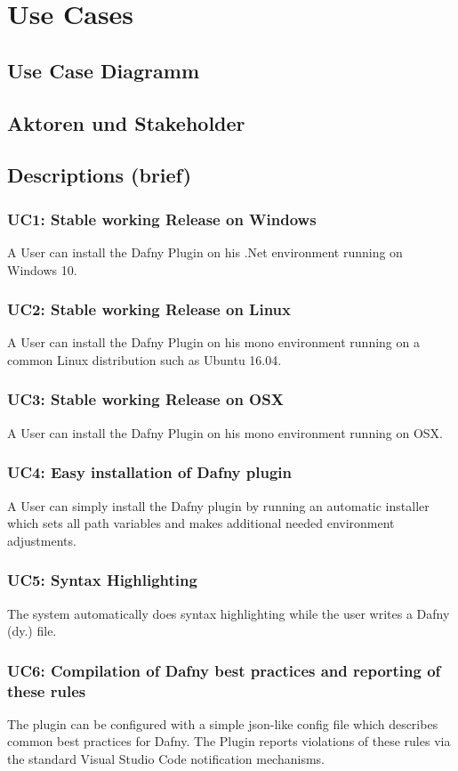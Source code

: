 \section{Use Cases}
\subsection{Use Case Diagramm}
\subsection{Aktoren und Stakeholder}
\subsection{Descriptions (brief)}
\subsubsection{UC1: Stable working Release on Windows}
A User can install the Dafny Plugin on his .Net environment running on Windows 10.
\subsubsection{UC2: Stable working Release on Linux}
A User can install the Dafny Plugin on his mono environment running on a common Linux distribution such as Ubuntu 16.04.
\subsubsection{UC3: Stable working Release on OSX}
A User can install the Dafny Plugin on his mono environment running on OSX.
\subsubsection{UC4: Easy installation of Dafny plugin}
A User can simply install the Dafny plugin by running an automatic installer which sets all path variables and makes additional needed environment adjustments.
\subsubsection{UC5: Syntax Highlighting}
The system automatically does syntax highlighting while the user writes a Dafny (dy.) file.
\subsubsection{UC6: Compilation of Dafny best practices and reporting of these rules}
The plugin can be configured with a simple json-like config file which describes common best practices for Dafny. The Plugin reports violations of these rules via the standard Visual Studio Code notification mechanisms.
